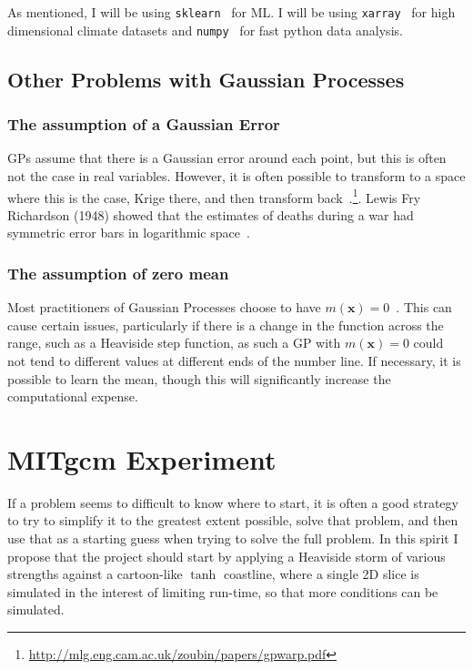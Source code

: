 \documentclass[usenames, dvipsnames, twocolumn]{article}
\begin{document}
As mentioned, I will be using \texttt{sklearn}~\cite{scikit-learn} for ML. I will be using \texttt{xarray}~\cite{hoyer2017xarray} for high dimensional climate datasets and  \texttt{numpy}~\cite{numpy} for fast
python data analysis.

\subsection{Other Problems with Gaussian Processes}
\subsubsection{The assumption of a Gaussian Error}
GPs assume that there is a Gaussian error around each point,
 but this is often not the case in real variables.
However, it is often possible to transform to a space where this is the case, Krige there,
 and then transform back~\cite{snelson2004warped}.\footnote{\url{http://mlg.eng.cam.ac.uk/zoubin/papers/gpwarp.pdf}}.
Lewis Fry Richardson (1948) showed that the estimates of deaths during a war had
 symmetric error bars in logarithmic space~\cite{richardson1948variation}.
\subsubsection{The assumption of zero mean}
Most practitioners of Gaussian Processes choose to have \(m(\mathbf{x})=0\)~\cite{williams2006gaussian}.
This can cause certain issues, particularly if there is a change
in the function across the range, such as a Heaviside step function,
as such a GP with \(m(\mathbf{x})=0\) could not tend to different values
at different ends of the number line.
If necessary, it is possible to learn the mean,
 though this will significantly increase the computational expense.


\section{MITgcm Experiment}
If a problem seems to difficult to know where to start, it is often a good strategy
to try to simplify it to the greatest extent possible,
solve that problem, and then use that as a starting guess when trying
to solve the full problem. In this spirit I propose that the project
should start by applying a Heaviside storm of various strengths against
a cartoon-like $\tanh$ coastline, where a single 2D slice is simulated
in the interest of limiting run-time, so that more conditions can be
simulated.
\end{document}
